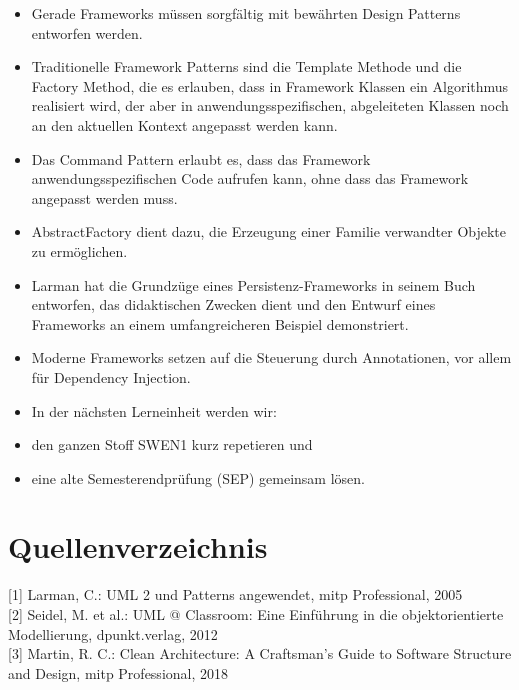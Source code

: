 \documentclass[10pt]{article}
\begin{document}
\begin{itemize}
  \item Gerade Frameworks müssen sorgfältig mit bewährten Design Patterns entworfen werden.
  \item Traditionelle Framework Patterns sind die Template Methode und die Factory Method, die es erlauben, dass in Framework Klassen ein Algorithmus realisiert wird, der aber in anwendungsspezifischen, abgeleiteten Klassen noch an den aktuellen Kontext angepasst werden kann.
  \item Das Command Pattern erlaubt es, dass das Framework anwendungsspezifischen Code aufrufen kann, ohne dass das Framework angepasst werden muss.
  \item AbstractFactory dient dazu, die Erzeugung einer Familie verwandter Objekte zu ermöglichen.
  \item Larman hat die Grundzüge eines Persistenz-Frameworks in seinem Buch entworfen, das didaktischen Zwecken dient und den Entwurf eines Frameworks an einem umfangreicheren Beispiel demonstriert.
  \item Moderne Frameworks setzen auf die Steuerung durch Annotationen, vor allem für Dependency Injection.
  \item In der nächsten Lerneinheit werden wir:
  \item den ganzen Stoff SWEN1 kurz repetieren und
  \item eine alte Semesterendprüfung (SEP) gemeinsam lösen.
\end{itemize}

\section*{Quellenverzeichnis}
[1] Larman, C.: UML 2 und Patterns angewendet, mitp Professional, 2005\\[0pt]
[2] Seidel, M. et al.: UML @ Classroom: Eine Einführung in die objektorientierte Modellierung, dpunkt.verlag, 2012\\[0pt]
[3] Martin, R. C.: Clean Architecture: A Craftsman's Guide to Software Structure and Design, mitp Professional, 2018
\end{document}
